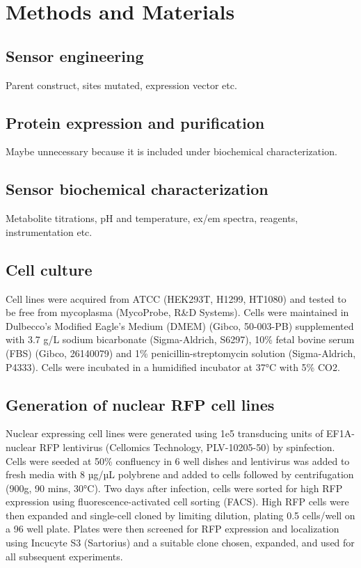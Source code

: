 \documentclass[9pt,lineno]{elife}
\begin{document}
\section{Methods and Materials}

\subsection{Sensor engineering}
Parent construct, sites mutated, expression vector etc.


\subsection{Protein expression and purification}
Maybe unnecessary because it is included under biochemical characterization.


\subsection{Sensor biochemical characterization}
Metabolite titrations, pH and temperature, ex/em spectra, reagents, instrumentation etc.





\subsection{Cell culture}
Cell lines were acquired from ATCC (HEK293T, H1299, HT1080) and tested to be free from mycoplasma (MycoProbe, R\&D Systems).
Cells were maintained in Dulbecco’s Modified Eagle’s Medium (DMEM) (Gibco, 50-003-PB) supplemented with 3.7 g/L sodium bicarbonate (Sigma-Aldrich, S6297), 10\% fetal bovine serum (FBS) (Gibco, 26140079) and 1\% penicillin-streptomycin solution (Sigma-Aldrich, P4333).
Cells were incubated in a humidified incubator at 37°C with 5\% CO2.

\subsection{Generation of nuclear RFP cell lines}
Nuclear expressing cell lines were generated using 1e5 transducing units of EF1A-nuclear RFP lentivirus (Cellomics Technology, PLV-10205-50) by spinfection.
Cells were seeded at 50\% confluency in 6 well dishes and lentivirus was added to fresh media with 8 µg/µL polybrene and added to cells followed by centrifugation (900g, 90 mins, 30°C).
Two days after infection, cells were sorted for high RFP expression using fluorescence-activated cell sorting (FACS).
High RFP cells were then expanded and single-cell cloned by limiting dilution, plating 0.5 cells/well on a 96 well plate.
Plates were then screened for RFP expression and localization using Incucyte S3 (Sartorius) and a suitable clone chosen, expanded, and used for all subsequent experiments. 
\end{document}
